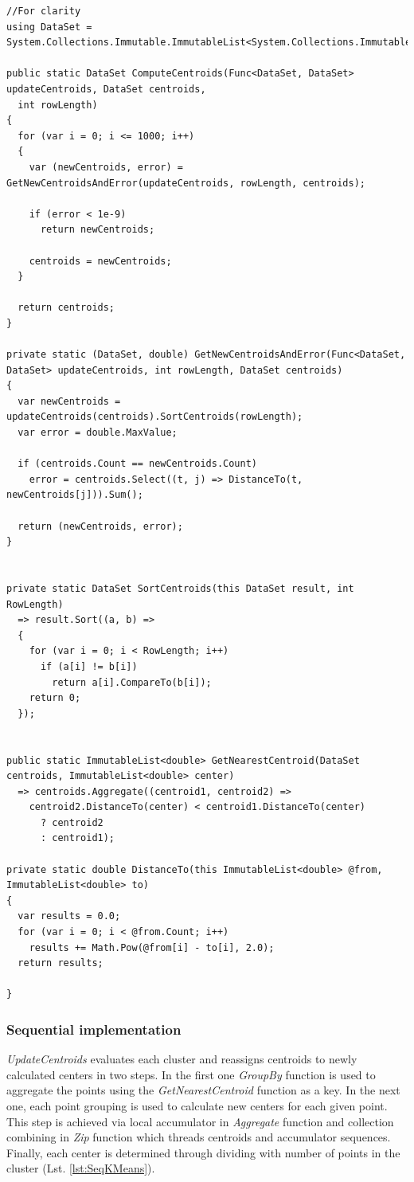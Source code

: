 \begin{lstlisting}[language={[sharp]c}, style=sharpcstyle, caption={K-means centroid computation}, label={lst:KMeans}]
//For clarity
using DataSet = System.Collections.Immutable.ImmutableList<System.Collections.Immutable.ImmutableList<double>>;

public static DataSet ComputeCentroids(Func<DataSet, DataSet> updateCentroids, DataSet centroids,
  int rowLength)
{
  for (var i = 0; i <= 1000; i++)
  {
    var (newCentroids, error) = GetNewCentroidsAndError(updateCentroids, rowLength, centroids);

    if (error < 1e-9)
      return newCentroids;
    
    centroids = newCentroids;
  }

  return centroids;
}

private static (DataSet, double) GetNewCentroidsAndError(Func<DataSet, DataSet> updateCentroids, int rowLength, DataSet centroids)
{
  var newCentroids = updateCentroids(centroids).SortCentroids(rowLength);
  var error = double.MaxValue;

  if (centroids.Count == newCentroids.Count)
    error = centroids.Select((t, j) => DistanceTo(t, newCentroids[j])).Sum();

  return (newCentroids, error);
}


private static DataSet SortCentroids(this DataSet result, int RowLength)
  => result.Sort((a, b) =>
  {
    for (var i = 0; i < RowLength; i++)
      if (a[i] != b[i])
        return a[i].CompareTo(b[i]);
    return 0;
  });


public static ImmutableList<double> GetNearestCentroid(DataSet centroids, ImmutableList<double> center) 
  => centroids.Aggregate((centroid1, centroid2) => 
    centroid2.DistanceTo(center) < centroid1.DistanceTo(center)
      ? centroid2
      : centroid1);

private static double DistanceTo(this ImmutableList<double> @from, ImmutableList<double> to)
{
  var results = 0.0;
  for (var i = 0; i < @from.Count; i++)
    results += Math.Pow(@from[i] - to[i], 2.0);
  return results;

}
\end{lstlisting}

\subsubsection{Sequential implementation}

\emph{UpdateCentroids} evaluates each cluster and reassigns centroids to newly calculated centers in two steps. In the first one \emph{GroupBy} function is used to aggregate the points using the \emph{GetNearestCentroid} function as a key. In the next one, each point grouping is used to calculate new centers for each given point. This step is achieved via local accumulator in \emph{Aggregate} function and collection combining in \emph{Zip} function which threads centroids and accumulator sequences. Finally, each center is determined through dividing with number of points in the cluster (Lst. \ref{lst:SeqKMeans}).


